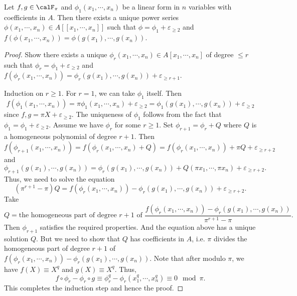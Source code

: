   \begin{lemma}\label{lem:find_homomorphism_between_f_and_g}
    Let $f,g \in \calF_\pi$ and $\phi_1(x_1,\cdots,x_n)$ be a linear form in $n$ variables with coefficients in $A$. 
    Then there exists a unique power series $\phi(x_1,\cdots,x_n) \in A[[x_1,\cdots,x_n]]$ such that $\phi = \phi_1 + \varepsilon_{\geq 2}$ and $f(\phi(x_1,\cdots,x_n)) = \phi(g(x_1),\cdots,g(x_n))$.
  \end{lemma}
  \begin{proof}
    Show there exists a unique $\phi_r(x_1,\cdots,x_n) \in A[x_1,\cdots,x_n]$ of degree $\leq r$ such that $\phi_r = \phi_1 + \varepsilon_{\geq 2}$ and $f(\phi_r(x_1,\cdots,x_n)) = \phi_r(g(x_1),\cdots,g(x_n)) + \varepsilon_{\geq r+1}$.
    
    Induction on $r \geq 1$.
    For $r=1$, we can take $\phi_1$ itself.
    Then 
    \[ f(\phi_1(x_1,\cdots,x_n)) = \pi \phi_1(x_1,\cdots,x_n) + \varepsilon_{\geq 2} = \phi_1(g(x_1),\cdots,g(x_n)) + \varepsilon_{\geq 2} \]
    since $f,g = \pi X + \varepsilon_{\geq 2}$.
    The uniqueness of $\phi_1$ follows from the fact that $\phi_1 = \phi_1 + \varepsilon_{\geq 2}$.
    Assume we have $\phi_r$ for some $r \geq 1$.
    Set $\phi_{r+1} = \phi_r + Q$ where $Q$ is a homogeneous polynomial of degree $r+1$.
    Then
    \[ f(\phi_{r+1}(x_1,\cdots,x_n)) = f(\phi_r(x_1,\cdots,x_n) + Q) = f(\phi_r(x_1,\cdots,x_n)) + \pi Q + \varepsilon_{\geq r+2} \]
    and
    \[ \phi_{r+1}(g(x_1),\cdots,g(x_n)) = \phi_r(g(x_1),\cdots,g(x_n)) + Q(\pi x_1,\cdots,\pi x_n) + \varepsilon_{\geq r+2}. \]
    Thus, we need to solve the equation
    \[ (\pi^{r+1} - \pi) Q = f(\phi_r(x_1,\cdots,x_n)) - \phi_r(g(x_1),\cdots,g(x_n)) + \varepsilon_{\geq r+2}. \]
    Take 
    \[ Q = \text{the homogeneous part of degree $r+1$ of } \frac{f(\phi_r(x_1,\cdots,x_n)) - \phi_r(g(x_1),\cdots,g(x_n))}{\pi^{r+1} - \pi}. \]
    Then $\phi_{r+1}$ satisfies the required properties.
    And the equation above has a unique solution $Q$.
    But we need to show that $Q$ has coefficients in $A$, i.e. $\pi$ divides the homogeneous part of degree $r+1$ of $f(\phi_r(x_1,\cdots,x_n)) - \phi_r(g(x_1),\cdots,g(x_n))$.
    Note that after modulo $\pi$, we have $f(X) \equiv X^q$ and $g(X) \equiv X^q$.
    Thus, 
    \[ f \circ \phi_r - \phi_r \circ g \equiv \phi_r^q - \phi_r(x_1^q,\cdots,x_n^q) \equiv 0 \mod \pi. \]
    This completes the induction step and hence the proof.
  \end{proof}

